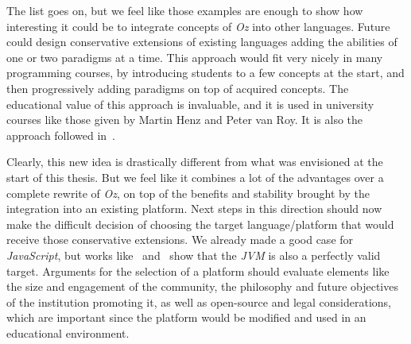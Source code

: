 The list goes on, but we feel like those examples are enough to show how interesting it could be to integrate concepts of \textit{Oz} into other languages.
Future could design conservative extensions of existing languages adding the abilities of one or two paradigms at a time.
This approach would fit very nicely in many programming courses, by introducing students to a few concepts at the start, and then progressively adding paradigms on top of acquired concepts.
The educational value of this approach is invaluable, and it is used in university courses like those given by Martin Henz and Peter van Roy.
It is also the approach followed in~\cite{van2004concepts}.\newline

Clearly, this new idea is drastically different from what was envisioned at the start of this thesis.
But we feel like it combines a lot of the advantages over a complete rewrite of \textit{Oz}, on top of the benefits and stability brought by the integration into an existing platform.
Next steps in this direction should now make the difficult decision of choosing the target language/platform that would receive those conservative extensions.
We already made a good case for \textit{JavaScript}, but works like~\cite{Ozma} and~\cite{drejhammar2003flow} show that the \textit{JVM} is also a perfectly valid target.
Arguments for the selection of a platform should evaluate elements like the size and engagement of the community, the philosophy and future objectives of the institution promoting it, as well as open-source and legal considerations, which are important since the platform would be modified and used in an educational environment.
